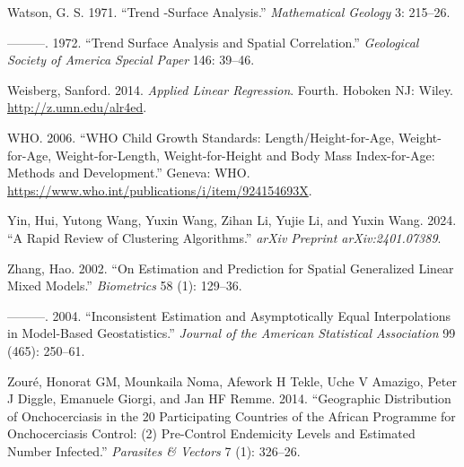 \documentclass[
  letterpaper,
]{krantz}
\newlength{\cslhangindent}
\newenvironment{CSLReferences}[2] %
 {\begin{list}{}{%
  \setlength{\itemindent}{0pt}
  \setlength{\leftmargin}{0pt}
  \setlength{\parsep}{0pt}
  \ifodd #1
   \setlength{\leftmargin}{\cslhangindent}
   \setlength{\itemindent}{-1\cslhangindent}
  \fi
  \setlength{\itemsep}{#2\baselineskip}}}
 {\end{list}}
\begin{document}
\begin{CSLReferences}{1}{0}
Watson, G. S. 1971. {``Trend -Surface Analysis.''} \emph{Mathematical
Geology} 3: 215--26.

---------. 1972. {``Trend Surface Analysis and Spatial Correlation.''}
\emph{Geological Society of America Special Paper} 146: 39--46.

Weisberg, Sanford. 2014. \emph{Applied Linear Regression}. Fourth.
Hoboken {NJ}: Wiley. \url{http://z.umn.edu/alr4ed}.

WHO. 2006. {``WHO Child Growth Standards: Length/Height-for-Age,
Weight-for-Age, Weight-for-Length, Weight-for-Height and Body Mass
Index-for-Age: Methods and Development.''} Geneva: WHO.
\url{https://www.who.int/publications/i/item/924154693X}.

Yin, Hui, Yutong Wang, Yuxin Wang, Zihan Li, Yujie Li, and Yuxin Wang.
2024. {``A Rapid Review of Clustering Algorithms.''} \emph{arXiv
Preprint arXiv:2401.07389}.

Zhang, Hao. 2002. {``On Estimation and Prediction for Spatial
Generalized Linear Mixed Models.''} \emph{Biometrics} 58 (1): 129--36.

---------. 2004. {``Inconsistent Estimation and Asymptotically Equal
Interpolations in Model-Based Geostatistics.''} \emph{Journal of the
American Statistical Association} 99 (465): 250--61.

Zouré, Honorat GM, Mounkaila Noma, Afework H Tekle, Uche V Amazigo,
Peter J Diggle, Emanuele Giorgi, and Jan HF Remme. 2014. {``Geographic
Distribution of Onchocerciasis in the 20 Participating Countries of the
African Programme for Onchocerciasis Control: (2) Pre-Control Endemicity
Levels and Estimated Number Infected.''} \emph{Parasites \& Vectors} 7
(1): 326--26.

\end{CSLReferences}



\printindex
\end{document}
